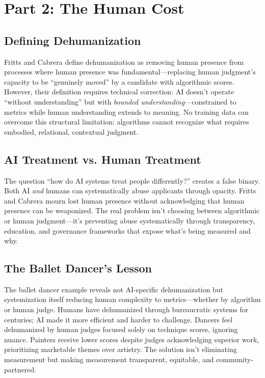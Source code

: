 \documentclass[11pt,twoside]{article}
\begin{document}
\section{Part 2: The Human Cost}

\subsection{Defining Dehumanization}
Fritts and Cabrera define dehumanization as removing human presence from processes where human presence was fundamental—replacing human judgment's capacity to be \enquote{genuinely moved} by a candidate with algorithmic scores. However, their definition requires technical correction: AI doesn't operate \enquote{without understanding} but with \textit{bounded understanding}—constrained to metrics while human understanding extends to meaning. No training data can overcome this structural limitation: algorithms cannot recognize what requires embodied, relational, contextual judgment.

\subsection{AI Treatment vs. Human Treatment}
The question \enquote{how do AI systems treat people differently?} creates a false binary. Both AI \textit{and} humans can systematically abuse applicants through opacity. Fritts and Cabrera mourn lost human presence without acknowledging that human presence can be weaponized. The real problem isn't choosing between algorithmic or human judgment—it's preventing abuse systematically through transparency, education, and governance frameworks that expose what's being measured and why.

\subsection{The Ballet Dancer's Lesson}
The ballet dancer example reveals not AI-specific dehumanization but systemization itself reducing human complexity to metrics—whether by algorithm or human judge. Humans have dehumanized through bureaucratic systems for centuries; AI made it more efficient and harder to challenge. Dancers feel dehumanized by human judges focused solely on technique scores, ignoring nuance. Painters receive lower scores despite judges acknowledging superior work, prioritizing marketable themes over artistry. The solution isn't eliminating measurement but making measurement transparent, equitable, and community-partnered.
\end{document}
